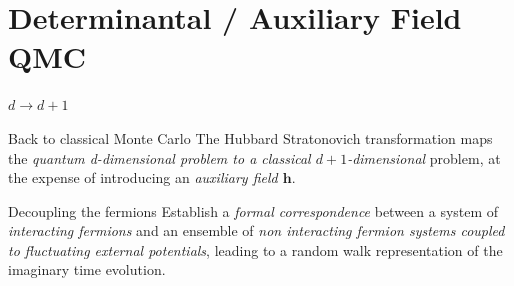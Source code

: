 \documentclass{beamer}
\begin{document}
%  	
%
 
  \section{Determinantal / Auxiliary Field QMC}
  \begin{frame}{$d \rightarrow d+1$}
  \begin{block}{Back to classical Monte Carlo}
  	The Hubbard Stratonovich transformation maps the \textit{quantum d-dimensional problem to a classical $d+1$-dimensional} problem, at the expense of introducing an \textit{auxiliary field $\bm h$}.
  	\end{block}
	\begin{block}{Decoupling the fermions}
  	 Establish a \textit{formal correspondence} between a system of \textit{interacting fermions} and an ensemble of \textit{non interacting fermion systems coupled to fluctuating external potentials}, leading to a random walk representation of the imaginary time evolution.
  	\end{block}
  \end{frame}
%  	
%  	
\end{document}
